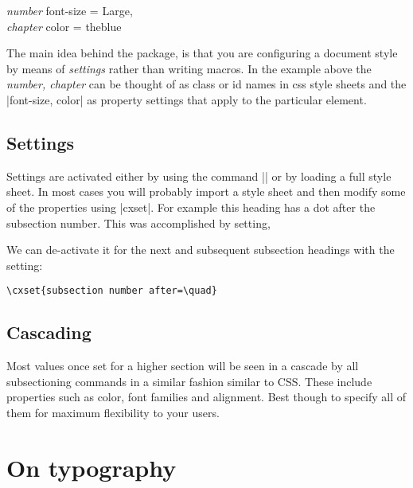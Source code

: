 \begin{scriptexample}{}{}
\textit{number} font-size = Large,\\
\textit{chapter} color = theblue
\end{scriptexample}
\smallskip

The main idea behind the package, is that you are configuring a document style by means of \emph{settings} rather than writing macros. In the example above the \emph{number, chapter} can be thought of as class or id names in css style sheets and the |font-size, color| as property settings that apply to the particular element. 


\subsection{Settings}

Settings are activated either by using the command |\cxset|  or by loading a full style sheet. In most cases you will probably import a style sheet and then modify some of the properties using |cxset|.  For example this heading has a dot after the subsection number. This was accomplished by setting,

We can de-activate it for the next and subsequent subsection headings with the setting:

\begin{scriptexample}{}{}
\begin{verbatim}
\cxset{subsection number after=\quad}
\end{verbatim}
\end{scriptexample}


\renewsubsection

\subsection{Cascading}

Most values once set for a higher section will be seen in a cascade by all subsectioning commands in a similar fashion similar to CSS. These include properties such as color, font families and alignment. Best though to specify all of them for maximum flexibility to your users.

\section{On typography}


